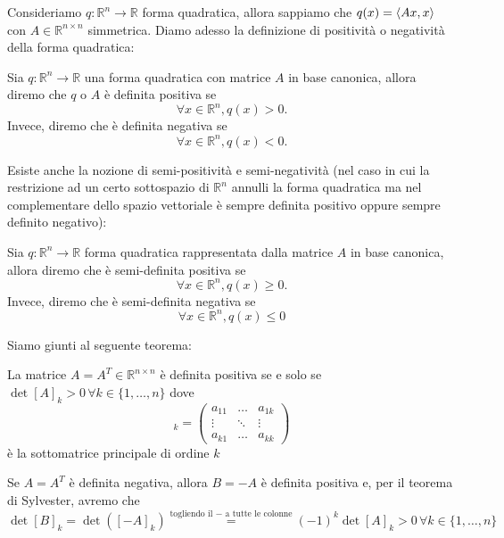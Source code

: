 Consideriamo $q: \mathbb{R}^n \to \mathbb{R}$ forma quadratica, allora sappiamo che $q(x) = \langle Ax, x \rangle$ con $A \in \mathbb{R}^{n \times n}$ simmetrica. Diamo adesso la definizione di positività o negatività della forma quadratica:
\begin{definition}
Sia $q:\mathbb{R}^n \to \mathbb{R}$ una forma quadratica con matrice $A$ in base canonica, allora diremo che $q$ o $A$ è definita positiva se
$$
\forall x \in \mathbb{R}^n, q(x) > 0.
$$
Invece, diremo che è definita negativa se
$$
\forall x \in \mathbb{R}^n, q(x) < 0.
$$
\end{definition}
Esiste anche la nozione di semi-positività e semi-negatività (nel caso in cui la restrizione ad un certo sottospazio di $\mathbb{R}^n$ annulli la forma quadratica ma nel complementare dello spazio vettoriale è sempre definita positivo oppure sempre definito negativo):
\begin{definition}
Sia $q: \mathbb{R}^n \to \mathbb{R}$ forma quadratica rappresentata dalla matrice $A$ in base canonica, allora diremo che è semi-definita positiva se
$$
\forall x \in \mathbb{R}^n, q(x) \geq 0.
$$
Invece, diremo che è semi-definita negativa se
$$
\forall x \in \mathbb{R}^n, q(x) \leq 0
$$
\end{definition}
Siamo giunti al seguente teorema:
\begin{theorem}
La matrice $A=A^{T} \in \mathbb{R}^{n \times n}$ è definita positiva se e solo se $\det{[A]}_k > 0 \, \forall k \in \{1, \ldots, n\}$ dove
\begin{equation*}
[A]_k = \begin{pmatrix}
a_{11} & \ldots & a_{1k} \\
\vdots & \ddots & \vdots \\
a_{k1} & \ldots & a_{kk}
\end{pmatrix}
\end{equation*}
è la sottomatrice principale di ordine $k$
\end{theorem}
\begin{remark}
Se $A=A^{T}$ è definita negativa, allora $B=-A$ è definita positiva e, per il teorema di Sylvester, avremo che
$$
\det{[B]_k} = \det{([-A]_k)} \stackrel{\text{togliendo il } - \text{ a tutte le colonne}}{=} (-1)^k \det{[A]_k} > 0 \, \forall k \in \{1, \ldots, n \}
$$
\end{remark}
